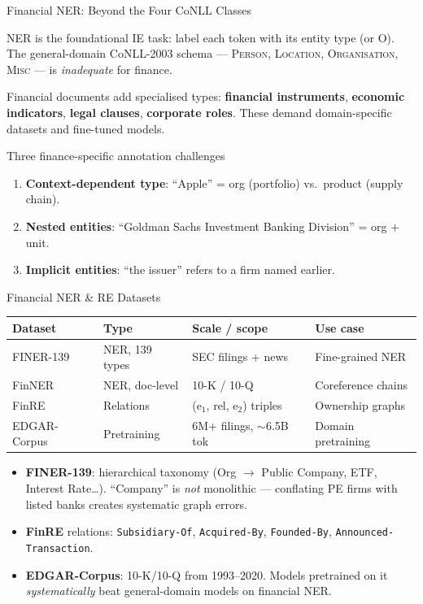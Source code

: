\documentclass[9pt,t]{beamer}
\begin{document}
\begin{frame}{Financial NER: Beyond the Four CoNLL Classes}
\begin{bigpicture}
NER is the foundational IE task: label each token with its entity type (or O).
The general-domain CoNLL-2003 schema --- \textsc{Person}, \textsc{Location},
\textsc{Organisation}, \textsc{Misc} --- is \emph{inadequate} for finance.
\end{bigpicture}

\medskip
Financial documents add specialised types: \textbf{financial instruments},
\textbf{economic indicators}, \textbf{legal clauses}, \textbf{corporate roles}.
These demand domain-specific datasets and fine-tuned models.

\medskip
\begin{block}{Three finance-specific annotation challenges}
\begin{enumerate}
  \item \textbf{Context-dependent type}: ``Apple'' = org (portfolio) vs.\ product (supply chain).
  \item \textbf{Nested entities}: ``Goldman Sachs Investment Banking Division'' = org $+$ unit.
  \item \textbf{Implicit entities}: ``the issuer'' refers to a firm named earlier.
\end{enumerate}
\end{block}
\end{frame}

\begin{frame}{Financial NER \& RE Datasets}
\small
\begin{tabular}{llll}
\toprule
\textbf{Dataset} & \textbf{Type} & \textbf{Scale / scope} & \textbf{Use case} \\
\midrule
FINER-139 & NER, 139 types  & SEC filings + news      & Fine-grained NER \\
FinNER    & NER, doc-level  & 10-K / 10-Q             & Coreference chains \\
FinRE     & Relations       & (e$_1$, rel, e$_2$) triples & Ownership graphs \\
EDGAR-Corpus & Pretraining  & 6M+ filings, $\sim$6.5B tok & Domain pretraining \\
\bottomrule
\end{tabular}

\medskip
\begin{itemize}
  \item \textbf{FINER-139}: hierarchical taxonomy (Org $\to$ Public Company, ETF,
        Interest Rate\dots). ``Company'' is \emph{not} monolithic --- conflating PE
        firms with listed banks creates systematic graph errors.
  \item \textbf{FinRE} relations: \texttt{Subsidiary-Of}, \texttt{Acquired-By},
        \texttt{Founded-By}, \texttt{Announced-Transaction}.
  \item \textbf{EDGAR-Corpus}: 10-K/10-Q from 1993--2020. Models pretrained on it
        \emph{systematically} beat general-domain models on financial NER.
\end{itemize}
\end{frame}
\end{document}
